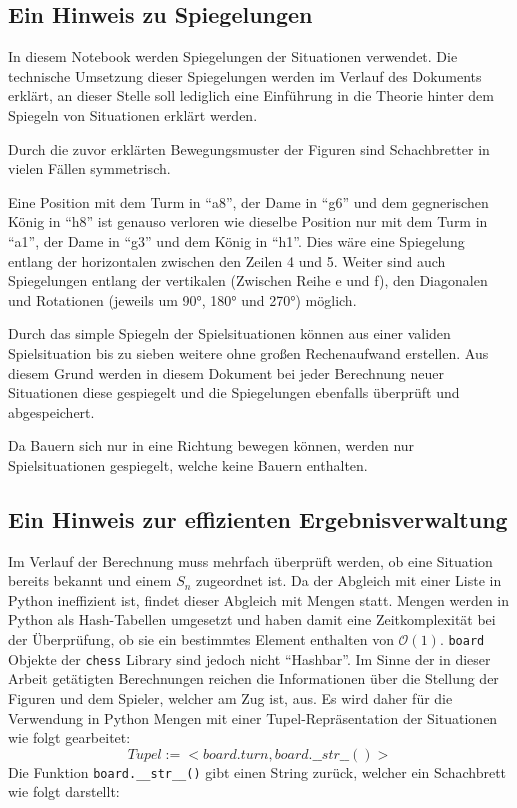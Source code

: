 \documentclass[a4paper,12pt]{article}
\begin{document}
    \hypertarget{ein-hinweis-zu-spiegelungen}{%
\subsection{Ein Hinweis zu
Spiegelungen}\label{ein-hinweis-zu-spiegelungen}}

In diesem Notebook werden Spiegelungen der Situationen verwendet. Die
technische Umsetzung dieser Spiegelungen werden im Verlauf des Dokuments
erklärt, an dieser Stelle soll lediglich eine Einführung in die Theorie
hinter dem Spiegeln von Situationen erklärt werden.

Durch die zuvor erklärten Bewegungsmuster der Figuren sind Schachbretter
in vielen Fällen symmetrisch.

Eine Position mit dem Turm in ``a8'', der Dame in ``g6'' und dem
gegnerischen König in ``h8'' ist genauso verloren wie dieselbe Position
nur mit dem Turm in ``a1'', der Dame in ``g3'' und dem König in ``h1''.
Dies wäre eine Spiegelung entlang der horizontalen zwischen den Zeilen 4
und 5. Weiter sind auch Spiegelungen entlang der vertikalen (Zwischen
Reihe e und f), den Diagonalen und Rotationen (jeweils um 90°, 180° und
270°) möglich.

Durch das simple Spiegeln der Spielsituationen können aus einer validen
Spielsituation bis zu sieben weitere ohne großen Rechenaufwand
erstellen. Aus diesem Grund werden in diesem Dokument bei jeder
Berechnung neuer Situationen diese gespiegelt und die Spiegelungen
ebenfalls überprüft und abgespeichert.

Da Bauern sich nur in eine Richtung bewegen können, werden nur
Spielsituationen gespiegelt, welche keine Bauern enthalten.

    \hypertarget{ein-hinweis-zur-effizienten-ergebnisverwaltung}{%
\subsection{Ein Hinweis zur effizienten
Ergebnisverwaltung}\label{ein-hinweis-zur-effizienten-ergebnisverwaltung}}

Im Verlauf der Berechnung muss mehrfach überprüft werden, ob eine
Situation bereits bekannt und einem \(S_n\) zugeordnet ist. Da der
Abgleich mit einer Liste in Python ineffizient ist, findet dieser
Abgleich mit Mengen statt. Mengen werden in Python als Hash-Tabellen
umgesetzt und haben damit eine Zeitkomplexität bei der Überprüfung, ob
sie ein bestimmtes Element enthalten von \(\mathcal{O}(1)\).
\texttt{board} Objekte der \texttt{chess} Library sind jedoch nicht
``Hashbar''. Im Sinne der in dieser Arbeit getätigten Berechnungen
reichen die Informationen über die Stellung der Figuren und dem Spieler,
welcher am Zug ist, aus. Es wird daher für die Verwendung in Python
Mengen mit einer Tupel-Repräsentation der Situationen wie folgt
gearbeitet: \[
Tupel := <board.turn, board.\_\_str\_\_()>
\] Die Funktion \texttt{board.\_\_str\_\_()} gibt einen String zurück,
welcher ein Schachbrett wie folgt darstellt:
\end{document}
